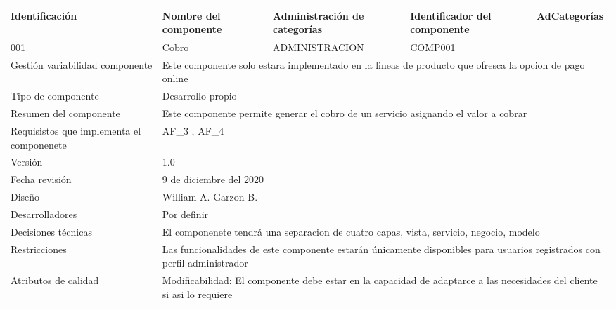 \documentclass[10pt,a4paper,openany]{book}
\begin{document}
\begin{longtable}{|p{3cm}|p{3cm}|p{3cm}|p{3cm}|p{3cm}|} \hline	
Identificación & Nombre del componente & Administración de categorías & Identificador del componente & AdCategorías \\[0.5ex] \hline	
001 & Cobro & ADMINISTRACION & COMP001 &  \\[0.5ex] \hline	
Gestión variabilidad componente & \multicolumn{4}{p{12cm}|}{Este componente solo estara implementado en la lineas de producto que ofresca la opcion de pago online} \\ \hline	
Tipo de componente     & \multicolumn{4}{p{12cm}|}{Desarrollo propio} \\ \hline	
Resumen del componente & \multicolumn{4}{p{12cm}|}{Este componente permite generar el cobro de un servicio asignando el valor a cobrar} \\ \hline	
Requisistos que implementa el componenete & \multicolumn{4}{p{12cm}|}{AF\_3 , AF\_4} \\ \hline	
Versión                & \multicolumn{4}{p{12cm}|}{1.0} \\ \hline	
Fecha revisión         & \multicolumn{4}{p{12cm}|}{9 de diciembre del 2020} \\ \hline	
Diseño                 & \multicolumn{4}{p{12cm}|}{William A. Garzon B.} \\ \hline	
Desarrolladores        & \multicolumn{4}{p{12cm}|}{Por definir} \\ \hline	
Decisiones técnicas    & \multicolumn{4}{p{12cm}|}{El componenete tendrá una separacion de cuatro capas, vista, servicio, negocio, modelo} \\ \hline	
Restricciones          & \multicolumn{4}{p{12cm}|}{Las funcionalidades de este componente estarán únicamente disponibles para usuarios registrados con perfil administrador} \\ \hline	
Atributos de calidad   & \multicolumn{4}{p{12cm}|}{Modificabilidad: El componente debe estar en la capacidad de adaptarce a las necesidades del cliente si asi lo requiere} \\ \hline	
\end{longtable}	
\end{document}
